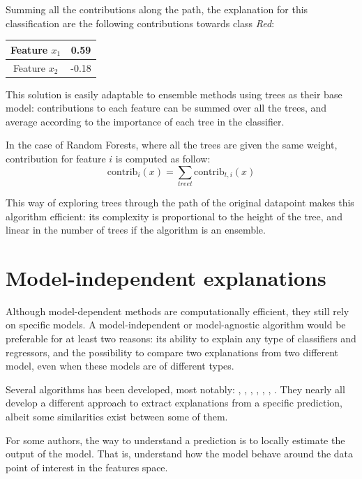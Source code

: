 \documentclass[a4paper,11pt]{kth-mag}
\begin{document}
Summing all the contributions along the path, the explanation for this classification are the following contributions towards class \textit{Red}:

\begin{center}
\begin{tabular}{|c|c|}
\hline
Feature $x_1$ & 0.59 \\
\hline
Feature $x_2$ & -0.18 \\
\hline
\end{tabular}
\end{center}

This solution is easily adaptable to ensemble methods using trees as their base model: contributions to each feature can be summed over all the trees, and average according to the importance of each tree in the classifier.

In the case of Random Forests, where all the trees are given the same weight, contribution for feature $i$ is computed as follow:
\[
	\mathrm{contrib}_i(x) = \sum_{tree t} \mathrm{contrib}_{t,i} (x)
\]

This way of exploring trees through the path of the original datapoint makes this algorithm efficient: its complexity is proportional to the height of the tree, and linear in the number of trees if the algorithm is an ensemble.

\section{Model-independent explanations}

Although model-dependent methods are computationally efficient, they still rely on specific models. A model-independent or model-agnostic algorithm would be preferable for at least two reasons: its ability to explain any type of classifiers and regressors, and the possibility to compare two explanations from two different model, even when these models are of different types.

Several algorithms has been developed, most notably: \cite{lime}, \cite{explvect}, \cite{explainingclassif}, \cite{evolutionnary}, \cite{gametheory}, \cite{ice}, \cite{sensitivity}. They nearly all develop a different approach to extract explanations from a specific prediction, albeit some similarities exist between some of them.

For some authors, the way to understand a prediction is to locally estimate the output of the model. That is, understand how the model behave around the data point of interest in the features space.
\end{document}
